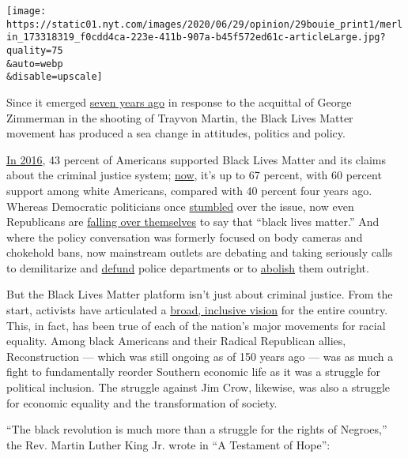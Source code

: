 \texttt{[image: https://static01.nyt.com/images/2020/06/29/opinion/29bouie\_print1/merlin\_173318319\_f0cdd4ca-223e-411b-907a-b45f572ed61c-articleLarge.jpg?quality=75\\\&auto=webp\\\&disable=upscale]}

Since it emerged \href{https://blacklivesmatter.com/herstory/}{seven
years ago} in response to the acquittal of George Zimmerman in the
shooting of Trayvon Martin, the Black Lives Matter movement has produced
a sea change in attitudes, politics and policy.

\href{https://www.pewresearch.org/fact-tank/2016/07/08/how-americans-view-the-black-lives-matter-movement/}{In
2016}, 43 percent of Americans supported Black Lives Matter and its
claims about the criminal justice system;
\href{https://www.pewsocialtrends.org/2020/06/12/amid-protests-majorities-across-racial-and-ethnic-groups-express-support-for-the-black-lives-matter-movement/}{now},
it's up to 67 percent, with 60 percent support among white Americans,
compared with 40 percent four years ago. Whereas Democratic politicians
once
\href{https://www.npr.org/sections/itsallpolitics/2015/07/31/427851451/democratic-candidates-stumble-over-black-lives-matter-movement}{stumbled}
over the issue, now even Republicans are
\href{https://www.theatlantic.com/politics/archive/2020/06/mitt-romney-black-lives-matter/612808/}{falling
over themselves} to say that ``black lives matter.'' And where the
policy conversation was formerly focused on body cameras and chokehold
bans, now mainstream outlets are debating and taking seriously calls to
demilitarize and
\href{https://www.brookings.edu/blog/fixgov/2020/06/19/what-does-defund-the-police-mean-and-does-it-have-merit/}{defund}
police departments or to
\href{https://www.nytimes.com/2020/06/12/opinion/sunday/floyd-abolish-defund-police.html}{abolish}
them outright.

But the Black Lives Matter platform isn't just about criminal justice.
From the start, activists have articulated a
\href{https://m4bl.org/policy-platforms/}{broad, inclusive vision} for
the entire country. This, in fact, has been true of each of the nation's
major movements for racial equality. Among black Americans and their
Radical Republican allies, Reconstruction --- which was still ongoing as
of 150 years ago --- was as much a fight to fundamentally reorder
Southern economic life as it was a struggle for political inclusion. The
struggle against Jim Crow, likewise, was also a struggle for economic
equality and the transformation of society.

``The black revolution is much more than a struggle for the rights of
Negroes,'' the Rev. Martin Luther King Jr. wrote in ``A Testament of
Hope'':

